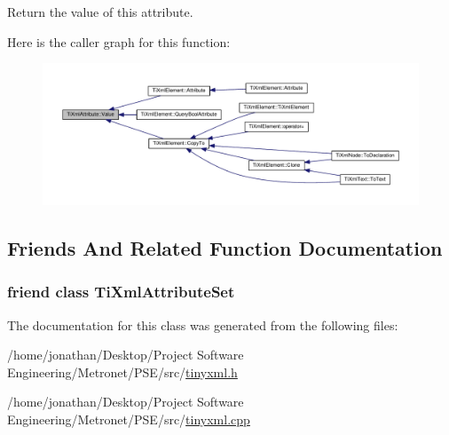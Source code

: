 Return the value of this attribute. 



Here is the caller graph for this function\+:
\nopagebreak
\begin{figure}[H]
\begin{center}
\leavevmode
\includegraphics[width=350pt]{class_ti_xml_attribute_a0f874490eac8ca00ee0070765d0e97e3_icgraph}
\end{center}
\end{figure}




\subsection{Friends And Related Function Documentation}
\subsubsection[{\texorpdfstring{Ti\+Xml\+Attribute\+Set}{TiXmlAttributeSet}}]{\setlength{\rightskip}{0pt plus 5cm}friend class {\bf Ti\+Xml\+Attribute\+Set}\hspace{0.3cm}{\ttfamily [friend]}}\hypertarget{class_ti_xml_attribute_a35a7b7f89f708527677d5078d41ce0bf}{}\label{class_ti_xml_attribute_a35a7b7f89f708527677d5078d41ce0bf}


The documentation for this class was generated from the following files\+:\begin{DoxyCompactItemize}
\item 
/home/jonathan/\+Desktop/\+Project Software Engineering/\+Metronet/\+P\+S\+E/src/\hyperlink{tinyxml_8h}{tinyxml.\+h}\item 
/home/jonathan/\+Desktop/\+Project Software Engineering/\+Metronet/\+P\+S\+E/src/\hyperlink{tinyxml_8cpp}{tinyxml.\+cpp}\end{DoxyCompactItemize}
